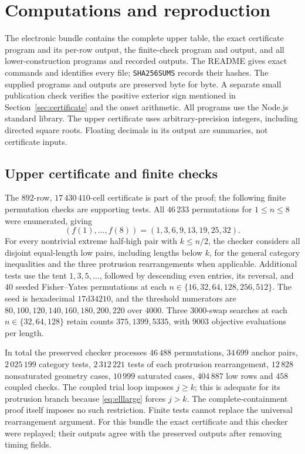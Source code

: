 \documentclass[10pt]{amsart}
\theoremstyle{remark}
\begin{document}
\section{Computations and reproduction}\label{sec:computations}
The electronic bundle contains the complete upper table, the exact
certificate program and its per-row output, the finite-check program
and output, and all lower-construction programs and recorded outputs.
The README gives exact commands and identifies every file;
\texttt{SHA256SUMS} records their hashes. The supplied programs and
outputs are preserved byte for byte. A separate small publication
check verifies the positive exterior sign mentioned in
Section~\ref{sec:certificate} and the onset arithmetic.
All programs use the Node.js standard library. The upper certificate
uses arbitrary-precision integers, including directed square roots.
Floating decimals in its output are summaries, not certificate inputs.

\subsection{Upper certificate and finite checks}
The $892$-row, $17\,430\,410$-cell certificate is part of the proof;
the following finite permutation checks are supporting tests.
All $46\,233$ permutations for $1\le n\le8$ were enumerated, giving
\[
 (f(1),\ldots,f(8))=(1,3,6,9,13,19,25,32).
\]
For every nontrivial extreme half-high pair with $k\le n/2$, the
checker considers all disjoint equal-length low pairs, including
lengths below $k$, for the general category inequalities and the
three protrusion rearrangements when applicable.
Additional tests use the tent $1,3,5,\ldots$, followed by descending
even entries, its reversal, and $40$ seeded Fisher--Yates permutations
at each $n\in\{16,32,64,128,256,512\}$.
The seed is hexadecimal $17\mathrm d34210$, and the threshold
numerators are $80,100,120,140,160,180,200,220$ over $4000$.
Three $3000$-swap searches at each $n\in\{32,64,128\}$ retain counts
$375,1399,5335$, with $9003$ objective evaluations per length.

In total the preserved checker processes $46\,488$ permutations,
$34\,699$ anchor pairs, $2\,025\,199$ category tests,
$2\,312\,221$ tests of each protrusion rearrangement,
$12\,828$ nonsaturated geometry cases, $10\,999$ saturated cases,
$404\,887$ low rows and $458$ coupled checks.
The coupled trial loop imposes $j\ge k$; this is adequate for its
protrusion branch because \eqref{eq:elllarge} forces $j>k$.
The complete-containment proof itself imposes no such restriction.
Finite tests cannot replace the universal rearrangement argument.
For this bundle the exact certificate and this checker were replayed;
their outputs agree with the preserved outputs after removing timing
fields.
\end{document}
